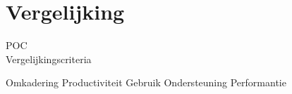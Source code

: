 \chapter{Vergelijking}
\label{chap:vergelijking}

POC \\ %
Vergelijkingscriteria %

Omkadering
Productiviteit
Gebruik
Ondersteuning
Performantie